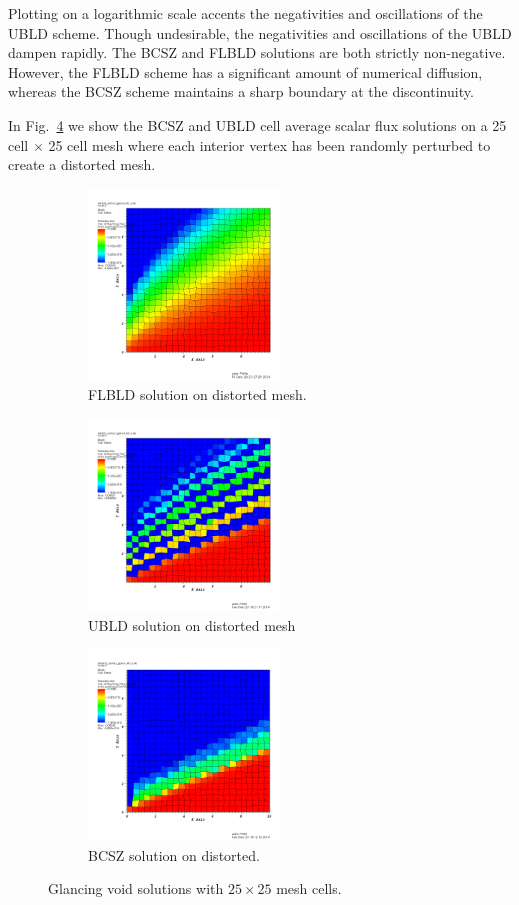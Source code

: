 \documentclass{mc2015}
\newcommand{\fig}[1]{Fig.~\ref{#1}}                      %
\begin{document}
Plotting on a logarithmic scale accents the negativities and oscillations of the UBLD scheme.
Though undesirable, the negativities and oscillations of the UBLD dampen rapidly.  
The BCSZ and FLBLD solutions are both strictly non-negative.  
However, the FLBLD scheme has a significant amount of numerical diffusion, whereas the BCSZ scheme maintains a sharp boundary at the discontinuity.

In \fig{fig:unstructured} we show the BCSZ and UBLD cell average scalar flux solutions on a 25 cell $\times$ 25 cell mesh where each interior vertex has been randomly perturbed to create a distorted mesh.
\begin{figure}[h]
	\begin{center}
	\begin{subfigure}{0.3\textwidth}
		\includegraphics[width=2in]{scb_unstruct.png}
		\caption{FLBLD solution on distorted mesh.}		
		\label{fig:unstructured_scb}
	\end{subfigure}
	\begin{subfigure}{0.3\textwidth}
		\includegraphics[width=2in]{bild_unstruct.png}
		\caption{UBLD solution on distorted mesh}		
		\label{fig:unstructured_bild}
	\end{subfigure}
	\begin{subfigure}{0.3\textwidth}
		\includegraphics[width=2in]{bcsz_unstruct.png}
		\caption{BCSZ solution on distorted.}
		\label{fig:unstructured_bcsz}
	\end{subfigure}		
	\caption{Glancing void solutions with $25\times 25$ mesh cells.}
	\label{fig:unstructured}
	\end{center}	
\end{figure}
\end{document}
